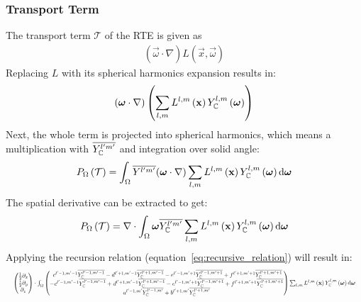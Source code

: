 \subsubsection*{Transport Term}
The transport term $\mathcal{T}$ of the RTE is given as
\begin{align*}
(\vec{\omega}\cdot\nabla)L(\vec{x}, \vec{\omega})
\end{align*}
Replacing $L$ with its spherical harmonics expansion results in:
\begin{align*}
\left(\boldsymbol{\mathbf{\omega}}\cdot\nabla\right)
\left(
\sum_{l,m}
{
L^{l,m}\left(\boldsymbol{\mathbf{x}}\right )
Y_{\mathbb{C}}^{l,m}\left(\boldsymbol{\mathbf{\omega}}\right)
}
\right)
\end{align*}
Next, the whole term is projected into spherical harmonics, which means a multiplication with $\overline{Y_{\mathbb{C}}^{l'm'}}$ and integration over solid angle:
\begin{align*}
P_\Omega\left(\mathcal{T}\right)=
\int_\Omega
{
\overline{Y^{l'm'}}(\boldsymbol{\mathbf{\omega}}\cdot\nabla)
\sum_{l,m}
{
L^{l,m}\left(\boldsymbol{\mathbf{x}}\right)
Y_{\mathbb{C}}^{l,m}\left(\boldsymbol{\mathbf{\omega}}\right)
}
}
\,\mathrm{d}\boldsymbol{\mathbf{\omega}}
\end{align*}
The spatial derivative can be extracted to get:
\begin{align*}
P_\Omega\left(\mathcal{T}\right)=
\nabla\cdot\int_\Omega
{
\boldsymbol{\mathbf{\omega}}\overline{Y_{\mathbb{C}}^{l'm'}}
\sum_{l,m}
{
L^{l,m}\left(\boldsymbol{\mathbf{x}}\right)
Y_{\mathbb{C}}^{l,m}\left(\boldsymbol{\mathbf{\omega}}\right)
}
\,\mathrm{d}\boldsymbol{\mathbf{\omega}}
}
\end{align*}
Applying the recursion relation (equation~\ref{eq:recursive_relation}) will result in:
\begin{equation*}
\resizebox{1.0\hsize}{!}{$
\begin{pmatrix}
\frac{1}{2}\partial_x\\
\frac{i}{2}\partial_y\\
\partial_z
\end{pmatrix}
\cdot
\int_\Omega
\begin{pmatrix}
\ c^{l'-1, m'-1}\overline{\SHBC^{l'-1,m'-1}} - d^{l'+1, m'-1}\overline{\SHBC^{l'+1,m'-1}} - e^{l'-1, m'+1}\overline{\SHBC^{l'-1,m'+1}} + f^{l'+1, m'+1}\overline{\SHBC^{l'+1,m'+1}}\\
-c^{l'-1, m'-1}\overline{\SHBC^{l'-1,m'-1}} + d^{l'+1, m'-1}\overline{\SHBC^{l'+1,m'-1}} - e^{l'-1, m'+1}\overline{\SHBC^{l'-1,m'+1}} + f^{l'+1, m'+1}\overline{\SHBC^{l'+1,m'+1}} \\
a^{l'-1, m'}\overline{\SHBC^{l'-1,m'}}+b^{l'+1, m'}\overline{\SHBC^{l'+1,m'}}
\end{pmatrix}
\sum_{l,m}{
L^{l,m}\left(\vec{x}\right )\SHBC^{l,m}\left(\vec{\omega}\right)
}
\ud\vec{\omega}
$}
\end{equation*}
